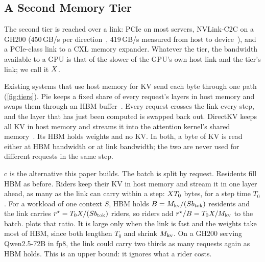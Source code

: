 \subsection{A Second Memory Tier}

The second tier is reached over a link: PCIe on most servers, NVLink-C2C on a
GH200 (450\,GB/s per direction~\cite{gh200page,directkv}, 419\,GB/s measured
from host to device~\cite{pie}), and a PCIe-class link to a CXL memory
expander. Whatever the tier, the bandwidth available to a GPU is that of the
slower of the GPU's own host link and the tier's link; we call it $X$.



Existing systems that use host memory for KV send each byte through one path
(\cref{fig:tiers}). Pie keeps a fixed share of every request's layers in host
memory and swaps them through an HBM buffer~\cite{pie}. Every request crosses
the link every step, and the layer that has just been computed is swapped
back out. DirectKV keeps all KV in host memory and streams it into the
attention kernel's shared memory~\cite{directkv}. Its HBM holds weights and
no KV. In both, a byte of KV is read either at HBM bandwidth or at link
bandwidth; the two are never used for different requests in the same step.



c is the alternative this paper builds. The batch is split by
request. Residents fill HBM as before. Riders keep their KV in host memory and
stream it in one layer ahead, as many as the link can carry within a step:
$X T_0$ bytes, for a step time $T_0$. For a workload of one context $S$,
HBM holds $B = M_{\mathrm{kv}}/(Sb_{\mathrm{tok}})$ residents and the link carries
$r^{\star} = T_0X/(Sb_{\mathrm{tok}})$ riders, so riders add
$r^{\star}/B = T_0X/M_{\mathrm{kv}}$ to the batch.  plots that
ratio. It is large only when the link is fast and the weights take most of
HBM, since both lengthen $T_0$ and shrink $M_{\mathrm{kv}}$. On a GH200 serving
Qwen2.5-72B in fp8, the link could carry two thirds as many requests again as
HBM holds. This is an upper bound: it ignores what a rider costs.

